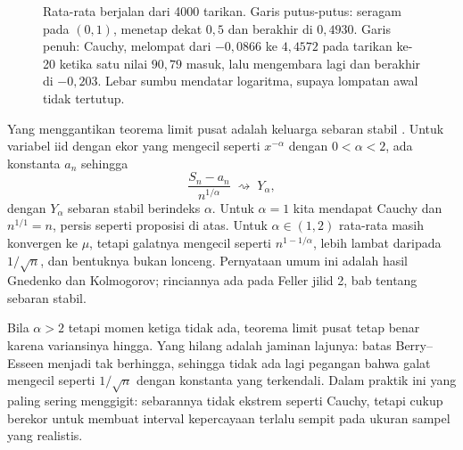\begin{figure}[htbp]
\caption{Rata-rata berjalan dari 4000 tarikan. Garis putus-putus: seragam pada
$(0,1)$, menetap dekat $0{,}5$ dan berakhir di $0{,}4930$. Garis penuh: Cauchy,
melompat dari $-0{,}0866$ ke $4{,}4572$ pada tarikan ke-20 ketika satu nilai
$90{,}79$ masuk, lalu mengembara lagi dan berakhir di $-0{,}203$. Lebar sumbu
mendatar logaritma, supaya lompatan awal tidak tertutup.}
\label{fig:cauchy-berjalan}
\end{figure}

Yang menggantikan teorema limit pusat adalah keluarga sebaran stabil
. Untuk
variabel iid dengan ekor yang mengecil seperti $x^{-\alpha}$ dengan
$0<\alpha<2$, ada konstanta $a_n$ sehingga
\[
\frac{S_n-a_n}{n^{1/\alpha}}\;\rightsquigarrow\;Y_\alpha,
\]
dengan $Y_\alpha$ sebaran stabil berindeks $\alpha$. Untuk $\alpha=1$ kita
mendapat Cauchy dan $n^{1/1}=n$, persis seperti proposisi di atas. Untuk
$\alpha\in(1,2)$ rata-rata masih konvergen ke $\mu$, tetapi galatnya mengecil
seperti $n^{1-1/\alpha}$, lebih lambat daripada $1/\sqrt n$, dan bentuknya bukan
lonceng. Pernyataan umum ini adalah hasil Gnedenko dan Kolmogorov; rinciannya ada
pada Feller jilid 2, bab tentang sebaran stabil.

Bila $\alpha>2$ tetapi momen ketiga tidak ada, teorema limit pusat tetap benar
karena variansinya hingga. Yang hilang adalah jaminan lajunya: batas
Berry--Esseen menjadi tak berhingga, sehingga tidak ada lagi pegangan bahwa galat
mengecil seperti $1/\sqrt n$ dengan konstanta yang terkendali. Dalam praktik ini
yang paling sering menggigit: sebarannya tidak ekstrem seperti Cauchy, tetapi
cukup berekor untuk membuat interval kepercayaan terlalu sempit pada ukuran
sampel yang realistis.

